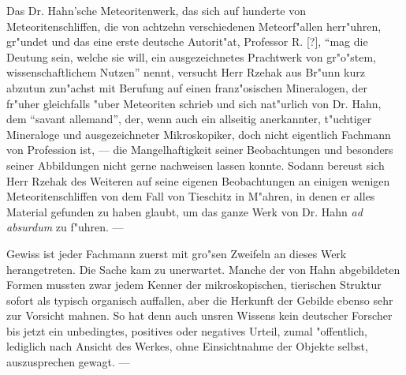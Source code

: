 \documentclass[a4paper, 12pt, oneside]{article}
\begin{document}
Das Dr. Hahn'sche Meteoritenwerk, das sich auf hunderte von Meteoritenschliffen, die von achtzehn verschiedenen Meteorf"allen herr"uhren, gr"undet und das eine erste deutsche Autorit"at, Professor R. [?], "`mag die Deutung sein, welche sie will, ein ausgezeichnetes Prachtwerk von gr"o"stem, wissenschaftlichem Nutzen"' nennt, versucht Herr Rzehak aus Br"unn kurz abzutun zun"achst mit Berufung auf einen franz"osischen Mineralogen, der fr"uher gleichfalls "uber Meteoriten schrieb und sich nat"urlich von Dr. Hahn, dem "`savant allemand"', der, wenn auch ein allseitig anerkannter, t"uchtiger Mineraloge und ausgezeichneter Mikroskopiker, doch nicht eigentlich Fachmann von Profession ist, --- die Mangelhaftigkeit seiner Beobachtungen und besonders seiner Abbildungen nicht gerne nachweisen lassen konnte. Sodann bereust sich Herr Rzehak des Weiteren auf seine eigenen Beobachtungen an einigen wenigen Meteoritenschliffen von dem Fall von Tieschitz in M"ahren, in denen er alles Material gefunden zu haben glaubt, um das ganze Werk von Dr. Hahn \emph{ad absurdum} zu f"uhren. ---

Gewiss ist jeder Fachmann zuerst mit gro"sen Zweifeln an dieses Werk herangetreten. Die Sache kam zu unerwartet. Manche der von Hahn abgebildeten Formen mussten zwar jedem Kenner der mikroskopischen, tierischen Struktur sofort als typisch organisch auffallen, aber die Herkunft der Gebilde ebenso sehr zur Vorsicht mahnen. So hat denn auch unsren Wissens kein deutscher Forscher bis jetzt ein unbedingtes, positives oder negatives Urteil, zumal "offentlich, lediglich nach Ansicht des Werkes, ohne Einsichtnahme der Objekte selbst, auszusprechen gewagt. ---
\end{document}
